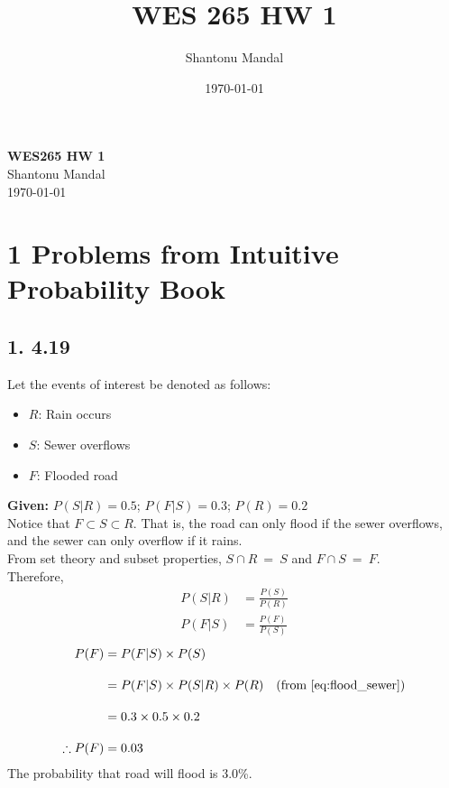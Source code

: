\documentclass[12pt]{article}
\title{WES 265 HW 1}
\author{Shantonu Mandal}
\date{\today}
\begin{document}
\begin{titlepage}
    \centering
    \vspace*{\fill}
    
    {\Huge \textbf{WES265 HW 1}} \\[0.5cm]
    {\Large Shantonu Mandal} \\[0.5cm]
    {\large \today}
    
    \vspace*{\fill} %
\end{titlepage}
\newpage


\tableofcontents
\newpage

\section*{1 \quad Problems from Intuitive Probability Book}

\subsection*{1. 4.19}
\label{subsec:1.1}
Let the events of interest be denoted as follows:
\begin{itemize}
    \item $R$: Rain occurs
    \item $S$: Sewer overflows
    \item $F$: Flooded road
\end{itemize}

\noindent \textbf{Given:} $P(S | R)=0.5$; $P(F|S)=0.3$; $P(R)=0.2$\\[10pt]
\noindent Notice that $F \subset S \subset R.$ That is, the road can only flood if the sewer overflows, and the sewer can only overflow if it rains.\\[10pt]
From set theory and subset properties, $S \cap R\ =\ S$ and $F \cap S\ =\ F$.\\[10pt]
\noindent Therefore,
\label{eq:prob_relations}
\begin{align}
    P(S|R) &= \frac{P(S)}{P(R)} \label{eq:sewer_rain} \\[10pt]
    P(F|S) &= \frac{P(F)}{P(S)} \label{eq:flood_sewer}
\end{align}
\begin{align*}
    P(F) &= P(F|S) \times P(S) \\[10pt]
    &= P(F|S) \times P(S|R) \times P(R) \quad \text{(from \eqref{eq:flood_sewer})} \\[10pt]
    &= 0.3 \times 0.5 \times 0.2 \\[10pt]
    \therefore P(F) &= 0.03
\end{align*}
The probability that road will flood is 3.0\%.
\end{document}
